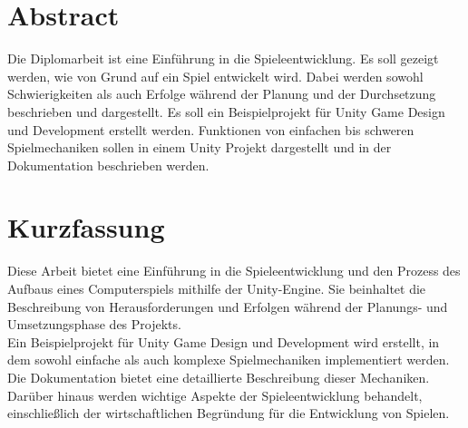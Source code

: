 \chapter*{Abstract}

Die Diplomarbeit ist eine Einführung in die Spieleentwicklung. Es soll gezeigt werden, wie von Grund auf ein Spiel entwickelt wird. Dabei werden sowohl Schwierigkeiten als auch Erfolge während der Planung und der Durchsetzung beschrieben und dargestellt. Es soll ein Beispielprojekt für Unity Game Design und Development erstellt werden. Funktionen von einfachen bis schweren Spielmechaniken sollen in einem Unity Projekt dargestellt und in der Dokumentation beschrieben werden. 

\chapter*{Kurzfassung}

Diese Arbeit bietet eine Einführung in die Spieleentwicklung und den Prozess des Aufbaus eines Computerspiels mithilfe der Unity-Engine. Sie beinhaltet die Beschreibung von Herausforderungen und Erfolgen während der Planungs- und Umsetzungsphase des Projekts. \\
Ein Beispielprojekt für Unity Game Design und Development wird erstellt, in dem sowohl einfache als auch komplexe Spielmechaniken implementiert werden. Die Dokumentation bietet eine detaillierte Beschreibung dieser Mechaniken. Darüber hinaus werden wichtige Aspekte der Spieleentwicklung behandelt, einschließlich der wirtschaftlichen Begründung für die Entwicklung von Spielen.